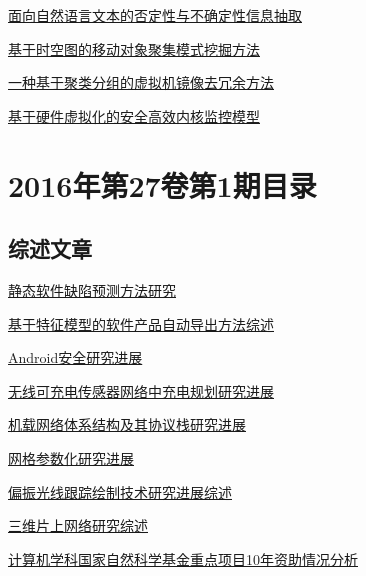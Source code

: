 \documentclass[a4paper]{article}
\begin{document}
\href{http://www.jos.org.cn/ch/reader/download_pdf.aspx?file_no=4860&year_id=2016&quarter_id=2&falg=1}{面向自然语言文本的否定性与不确定性信息抽取}

\href{http://www.jos.org.cn/ch/reader/download_pdf.aspx?file_no=4797&year_id=2016&quarter_id=2&falg=1}{基于时空图的移动对象聚集模式挖掘方法}

\href{http://www.jos.org.cn/ch/reader/download_pdf.aspx?file_no=4878&year_id=2016&quarter_id=2&falg=1}{一种基于聚类分组的虚拟机镜像去冗余方法}

\href{http://www.jos.org.cn/ch/reader/download_pdf.aspx?file_no=4866&year_id=2016&quarter_id=2&falg=1}{基于硬件虚拟化的安全高效内核监控模型}


\section{\textbf{2016年第27卷第1期目录}}
\subsection{综述文章}
\href{http://www.jos.org.cn/ch/reader/download_pdf.aspx?file_no=4923&year_id=2016&quarter_id=1&falg=1}{静态软件缺陷预测方法研究}

\href{http://www.jos.org.cn/ch/reader/download_pdf.aspx?file_no=4929&year_id=2016&quarter_id=1&falg=1}{基于特征模型的软件产品自动导出方法综述}

\href{http://www.jos.org.cn/ch/reader/download_pdf.aspx?file_no=4914&year_id=2016&quarter_id=1&falg=1}{Android安全研究进展}

\href{http://www.jos.org.cn/ch/reader/download_pdf.aspx?file_no=4883&year_id=2016&quarter_id=1&falg=1}{无线可充电传感器网络中充电规划研究进展}

\href{http://www.jos.org.cn/ch/reader/download_pdf.aspx?file_no=4925&year_id=2016&quarter_id=1&falg=1}{机载网络体系结构及其协议栈研究进展}

\href{http://www.jos.org.cn/ch/reader/download_pdf.aspx?file_no=4919&year_id=2016&quarter_id=1&falg=1}{网格参数化研究进展}

\href{http://www.jos.org.cn/ch/reader/download_pdf.aspx?file_no=4871&year_id=2016&quarter_id=1&falg=1}{偏振光线跟踪绘制技术研究进展综述}

\href{http://www.jos.org.cn/ch/reader/download_pdf.aspx?file_no=4933&year_id=2016&quarter_id=1&falg=1}{三维片上网络研究综述}

\href{http://www.jos.org.cn/ch/reader/download_pdf.aspx?file_no=5011&year_id=2016&quarter_id=1&falg=1}{计算机学科国家自然科学基金重点项目10年资助情况分析}
\end{document}
